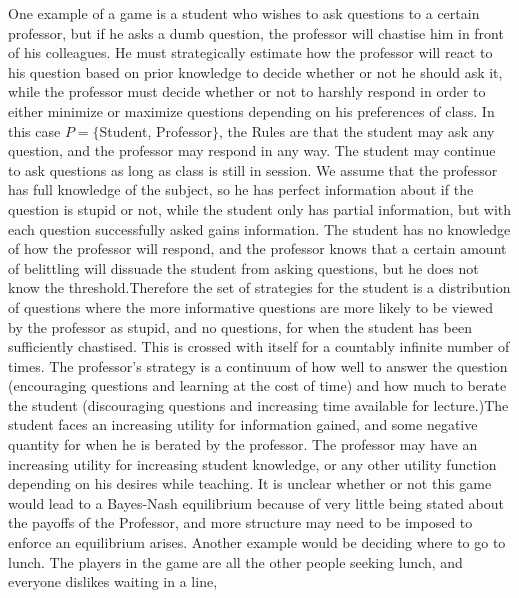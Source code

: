 \documentclass[12pt]{paper}
\begin{document}
One example of a game is a student who wishes to ask questions to a certain
professor, but if he asks a dumb question, the professor will chastise him in
front of his colleagues. He must strategically estimate how the professor will
react to his question based on prior knowledge to decide whether or not he
should ask it, while the professor must decide whether or not to harshly respond
in order to either minimize or maximize questions depending on his preferences
of class. In this case $P = \{ $Student, Professor$\}$, the Rules are that the
student may ask any question, and the professor may respond in any way. The
student may continue to ask questions as long as class is still in session.
\newline We assume that the professor has full knowledge of the subject, so he has perfect
information about if the question is stupid or not, while the student only has
partial information, but with each question successfully asked gains
information. The student has no knowledge of how the professor will respond, and
the professor knows that a certain amount of belittling will dissuade the
student from asking questions, but he does not know the threshold.\newline Therefore the
set of strategies for the student is a distribution of questions where the more
informative questions are more likely to be viewed by the professor as stupid,
and no questions, for when the student has been sufficiently chastised. This is
crossed with itself for a countably infinite number of times. The professor's
strategy is a continuum of how well to answer the question (encouraging
questions and learning at the cost of time) and how much to berate the student
(discouraging questions and increasing time available for lecture.)\newline The student
faces an increasing utility for information gained, and some negative quantity
for when he is berated by the professor. The professor may have an increasing
utility for increasing student knowledge, or any other utility function
depending on his desires while teaching. \newline It is unclear whether or not this
game would lead to a Bayes-Nash equilibrium because of very little being stated
about the payoffs of the Professor, and more structure may need to be imposed to
enforce an equilibrium arises.
\newline \newline
Another example would be deciding where to go to lunch. The players in the game
are all the other people seeking lunch, and everyone dislikes waiting in a line,
\end{document}
